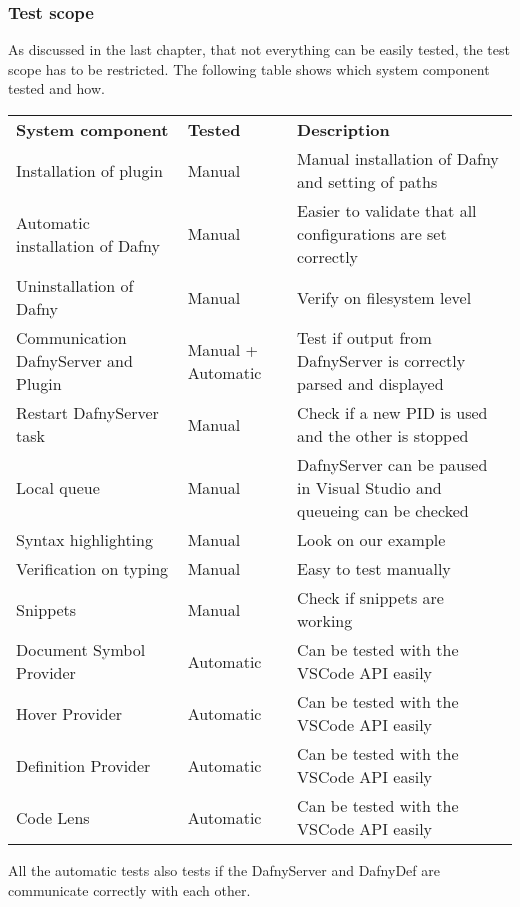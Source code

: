 \subsubsection{Test scope}
As discussed in the last chapter, that not everything can be easily tested, the test scope has to be restricted. The following table shows which system component tested and how.
\begin{longtable}{ p{} | p{} | p{} }
\textbf{System component} & \textbf{Tested} & \textbf{Description}\\
	Installation of plugin & Manual & Manual installation of Dafny and setting of paths   \\
	Automatic installation of Dafny & Manual & Easier to validate that all configurations are set correctly \\
	Uninstallation of Dafny & Manual & Verify on filesystem level\\
	Communication DafnyServer and Plugin & Manual + Automatic & Test if output from DafnyServer is correctly parsed and displayed\\
	Restart DafnyServer task & Manual & Check if a new PID is used and the other is stopped\\
	Local queue & Manual & DafnyServer can be paused in Visual Studio and queueing can be checked \\
	Syntax highlighting & Manual & Look on our example \\
	Verification on typing & Manual & Easy to test manually\\
	Snippets & Manual & Check if snippets are working\\
	Document Symbol Provider & Automatic & Can be tested with the VSCode API easily \\
	Hover Provider & Automatic & Can be tested with the VSCode API easily \\
	Definition Provider & Automatic & Can be tested with the VSCode API easily  \\
	Code Lens & Automatic & Can be tested with the VSCode API easily \\
\end{longtable}
All the automatic tests also tests if the DafnyServer and DafnyDef are communicate correctly with each other. 


